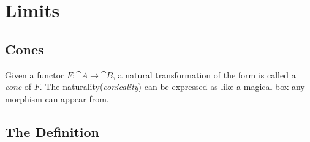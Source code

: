 
\section{Limits}

\subsection{Cones}

Given a functor $F : \cat A \to \cat B$, a natural transformation of the form
is called a \emph{cone} of $F$. The naturality(\emph{conicality}) can be expressed as
like a magical box any morphism can appear from.


\subsection{The Definition}

